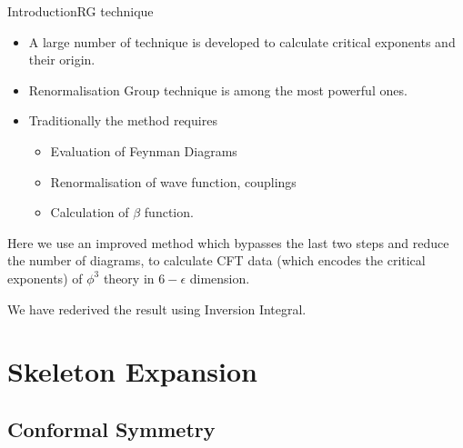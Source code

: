 \documentclass[pdf]{beamer}
\begin{document}
            \begin{frame}[t]{Introduction}{RG technique}
                \begin{itemize}
                    \item <2-> A large number of technique is developed to calculate critical exponents and their origin.
                    \item <3-> Renormalisation Group technique is among the most powerful ones.
                    \item <4-> Traditionally the method requires
                    \begin{itemize}
                        \item <5-> Evaluation of Feynman Diagrams
                        \item <6-> Renormalisation of wave function, couplings
                        \item <7-> Calculation of $\beta$ function.
                    \end{itemize}
                \end{itemize}
                Here we use an improved method which bypasses the last two steps and reduce the number of diagrams, to calculate CFT data (which encodes the critical exponents) of $\phi^3$ theory in $6-\epsilon$ dimension.\footnotemark
                \par
                We have rederived the result using Inversion Integral.
            \end{frame}
        \section{Skeleton Expansion}

            \subsection{Conformal Symmetry}
\end{document}
